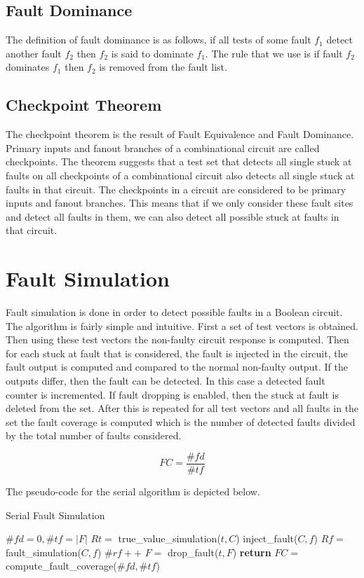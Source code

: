 \documentclass[a4paper,12pt]{article}
\begin{document}
\subsection*{Fault Dominance}
The definition of fault dominance is as follows, if all tests of some fault $f_1$ detect another fault $f_2$ then $f_2$ is said to dominate $f_1$. The rule that we use is if fault $f_2$ dominates $f_1$ then $f_2$ is removed from the fault list.

\subsection*{Checkpoint Theorem}
The checkpoint theorem is the result of Fault Equivalence and Fault Dominance. Primary inputs and fanout branches of a combinational circuit are called checkpoints. The theorem suggests that a test set that detects all single stuck at faults on all checkpoints of a combinational circuit also detects all single stuck at faults in that circuit. The checkpoints in a circuit are considered to be primary inputs and fanout branches. This means that if we only consider these fault sites and detect all faults in them, we can also detect all possible stuck at faults in that circuit.

\section*{Fault Simulation}
Fault simulation is done in order to detect possible faults in a Boolean circuit. The algorithm is fairly simple and intuitive. First a set of test vectors is obtained. Then using these test vectors the non-faulty circuit response is computed. Then for each stuck at fault that is considered, the fault is injected in the circuit, the fault output is computed and compared to the normal non-faulty output. If the outputs differ, then the fault can be detected. In this case a detected fault counter is incremented. If fault dropping is enabled, then the stuck at fault is deleted from the set. After this is repeated for all test vectors and all faults in the set the fault coverage is computed which is the number of detected faults divided by the total number of faults considered. 

$$FC = \frac{\#fd}{\#tf}$$

The pseudo-code for the serial algorithm is depicted below.

\begin{algorithm}
	\caption{Serial Fault Simulation} 
	\begin{algorithmic}[1]
		\State $\#fd = 0, \#tf = |F|$
			\State $Rt = $ true\_value\_simulation($t,C$)
					\State inject\_fault($C,f$)
					\State $Rf = $ fault\_simulation($C,f$)
					\State $\#rf++$
					\State $F = $ drop\_fault($t,F$)
				\EndIf	
			\EndFor
		\EndFor
					\State \textbf{return} $FC = $ compute\_fault\_coverage($\#fd,\#tf$)
	\end{algorithmic} 
\end{algorithm}
\end{document}
